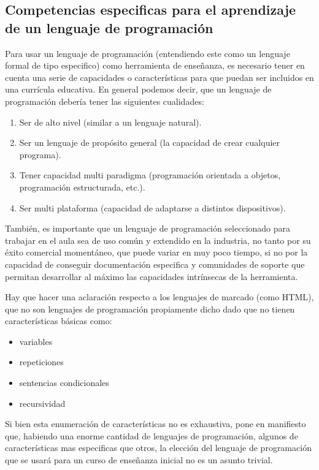 \subsection{Competencias especificas para el aprendizaje de un lenguaje de programación}

Para usar un lenguaje de programación (entendiendo este como un lenguaje formal de tipo especifico) como herramienta de enseñanza, es necesario tener en cuenta una serie de capacidades o características para que puedan ser incluidos en una currícula educativa. En general podemos decir, que un lenguaje de programación debería tener las siguientes cualidades:

\begin{enumerate}
   \item Ser de alto nivel (similar a un lenguaje natural).
   \item Ser un lenguaje de propósito general (la capacidad de crear cualquier programa).
   \item Tener capacidad multi paradigma (programación orientada a objetos, programación estructurada, etc.).
   \item Ser multi plataforma (capacidad de adaptarse a distintos dispositivos).
 \end{enumerate} 
 
También, es importante que un lenguaje de programación seleccionado para trabajar en el aula sea de uso común y extendido en la industria, no tanto por su éxito comercial momentáneo, que puede variar en muy poco tiempo, si no por la capacidad de conseguir documentación especifica y comunidades de soporte que permitan desarrollar al máximo las capacidades intrínsecas de la herramienta.

Hay que hacer una aclaración respecto a los lenguajes de marcado (como HTML), que no son lenguajes de programación propiamente dicho dado que no tienen características básicas como:

\begin{itemize}
   \item variables
   \item repeticiones
   \item sentencias condicionales
   \item recursividad
 \end{itemize} 

Si bien esta enumeración de características no es exhaustiva, pone en manifiesto que, habiendo una enorme cantidad de lenguajes de programación, algunos de características mas especificas que otros, la elección del lenguaje de programación que se usará para un curso de enseñanza inicial no es un asunto trivial.


